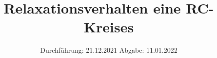 

\subject{V353}
\title{Relaxationsverhalten eine RC-Kreises}
\date{%
  Durchführung: 21.12.2021
  \hspace{3em}
  Abgabe: 11.01.2022
}



\maketitle
\thispagestyle{empty}
\tableofcontents
\newpage








\printbibliography{}


